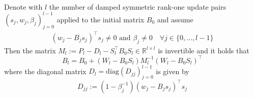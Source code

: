 \documentclass{svmult}
\begin{document}
\begin{theorem}\\
	Denote with $l$ the number of damped symmetric rank-one update pairs $(s_j,w_j,\beta_j)_{j=0}^{l-1}$ applied to the initial matrix $B_0$ and 
	assume
	\begin{align}
		\label{tb:sr1stab}
		(w_j -B_j s_j)^{\top}s_j\neq 0 \mbox{ and } \beta_j \neq 0 \quad \forall j \in \{0,\dots,l-1\}
	\end{align} 
	Then the matrix $M_l:=P_l - D_l - S_l^\top B_0 S_l\in \mathbb{R}^{l \times l}$ is invertible and it holds that
	\begin{equation*}
		 B_l=B_0 +(W_l- B_0 S_l)M^{-1}_l (W_l-B_0 S_l)^{\top}
	\end{equation*}
	where the diagonal matrix $D_l=\mathrm{diag}(D_{jj})_{j=0}^{l-1}$ is given by
	\begin{equation*}
		 D_{jj}:=(1-\beta^{-1}_j)(w_j -B_j s_j)^{\top}s_j
	\end{equation*}
\end{theorem}
\end{document}
